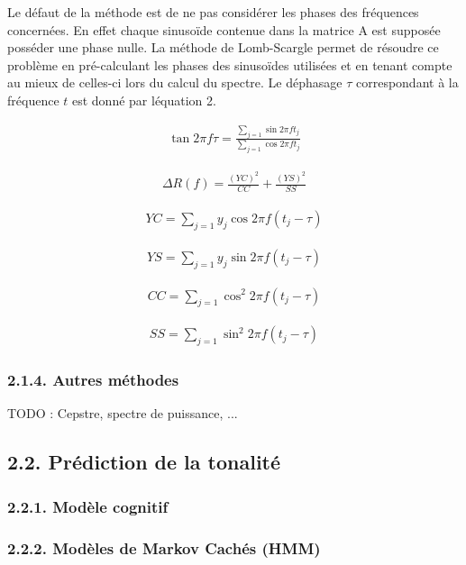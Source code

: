 \documentclass[letterpaper]{article}
\begin{document}
Le défaut de la méthode est de ne pas considérer les phases des fréquences concernées. En effet chaque sinusoïde contenue dans la matrice A
est supposée posséder une phase nulle. La méthode de Lomb-Scargle permet de résoudre ce problème en pré-calculant les phases des sinusoïdes
utilisées et en tenant compte au mieux de celles-ci lors du calcul du spectre. Le déphasage $\tau$ correspondant à la fréquence $t$ est donné par
l\textquotesingle équation 2. \citep{LS}

\begin{align}
\tan 2\pi f \tau = \frac{\sum\limits_{j=1} \sin 2\pi f t_{j}}{\sum\limits_{j=1} \cos 2\pi f t_{j}}
\end{align}

\begin{align}
\Delta R(f) = \frac{(YC)^{2}}{CC} 
+ \frac{(YS)^{2}}{SS}
\end{align}

\begin{align}
YC = \sum\limits_{j=1} y_{j}\cos 2\pi f (t_{j} - \tau)
\end{align}

\begin{align}
YS = \sum\limits_{j=1} y_{j}\sin 2\pi f (t_{j} - \tau)
\end{align}

\begin{align}
CC = \sum\limits_{j=1} \cos^{2} 2\pi f (t_{j} - \tau)
\end{align}

\begin{align}
SS = \sum\limits_{j=1} \sin^{2} 2\pi f (t_{j} - \tau)
\end{align}

\subsubsection*{2.1.4. Autres méthodes}

TODO : Cepstre, spectre de puissance, ...

\subsection*{2.2. Prédiction de la tonalité}

\subsubsection*{2.2.1. Modèle cognitif}

\subsubsection*{2.2.2. Modèles de Markov Cachés (HMM)}
\end{document}
